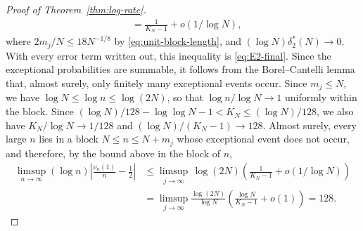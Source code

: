 \begin{proof}[Proof of Theorem~\ref{thm:log-rate}]
\begin{align*}
 &=\frac1{K_N-1}+o(1/\log N),
\end{align*}
where $2m_j/N\le18N^{-1/8}$ by \eqref{eq:unit-block-length},
and $(\log N)\delta_2^*(N)\to0$.
With every error term written out, this inequality is
\eqref{eq:E2-final}.
Since the exceptional probabilities are summable, it follows from the
Borel--Cantelli lemma that, almost surely, only finitely many exceptional
events occur.
Since $m_j\le N$, we have $\log N\le\log n\le\log(2N)$, so that
$\log n/\log N\to1$ uniformly within the block. Since
$(\log N)/128-\log\log N-1<K_N\le(\log N)/128$, we also have
$K_N/\log N\to1/128$ and $(\log N)/(K_N-1)\to128$.
Almost surely, every large $n$ lies in a block $N\le n\le N+m_j$ whose
exceptional event does not occur, and therefore, by the bound above in
the block of $n$,
\begin{align*}
 \limsup_{n\to\infty}(\log n)\left|\frac{\nu_n(1)}n-\frac12\right|
 &\le\limsup_{j\to\infty}\,\log(2N)
   \left(\frac1{K_N-1}+o(1/\log N)\right)\\
 &=\limsup_{j\to\infty}\frac{\log(2N)}{\log N}
   \left(\frac{\log N}{K_N-1}+o(1)\right)
 =128.
\end{align*}
\end{proof}

